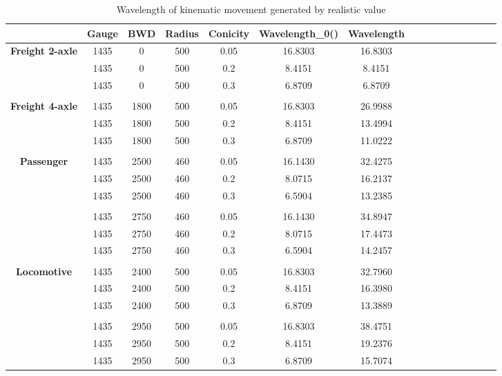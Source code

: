 \begin{table}[h]
  \centering
  \caption{Wavelength of kinematic movement generated by realistic value}
    \begin{tabular}{cccccccccccccccc}
    \toprule
    & Gauge & BWD & Radius & Conicity & Wavelength\_0() &Wavelength & \\
    \midrule
    \textbf{Freight 2-axle} & 1435 & 0 & 500 & 0.05 & 16.8303 & 16.8303 \\
    \textbf{} & 1435 & 0 & 500 & 0.2 & 8.4151 & 8.4151  \\
    \textbf{} & 1435 & 0 & 500 & 0.3 & 6.8709 & 6.8709  \\
    \textbf{}       &       &       &       &       &       &       &  \\
    \textbf{Freight 4-axle} & 1435 & 1800 & 500 & 0.05 & 16.8303 & 26.9988 \\
    \textbf{} & 1435 & 1800 & 500 & 0.2 & 8.4151 & 13.4994  \\
    \textbf{} & 1435 & 1800 & 500 & 0.3 & 6.8709 & 11.0222  \\
    \textbf{}       &       &       &       &       &       &       &  \\
    \textbf{Passenger} & 1435 & 2500 & 460 & 0.05 & 16.1430 & 32.4275 \\
    \textbf{} & 1435 & 2500 & 460 & 0.2 & 8.0715 & 16.2137  \\
    \textbf{} & 1435 & 2500 & 460 & 0.3 & 6.5904 & 13.2385 \\
    \textbf{}       &       &       &       &       &       &       &  \\
    \textbf{} & 1435 & 2750 & 460 & 0.05 & 16.1430 & 34.8947 \\
    \textbf{} & 1435 & 2750 & 460 & 0.2 & 8.0715 & 17.4473  \\
    \textbf{} & 1435 & 2750 & 460 & 0.3 & 6.5904 & 14.2457  \\
    \textbf{}       &       &       &       &       &       &       &  \\
    \textbf{Locomotive} & 1435 & 2400 & 500 & 0.05 & 16.8303 & 32.7960 \\
    \textbf{} & 1435 & 2400 & 500 & 0.2 & 8.4151 & 16.3980  \\
    \textbf{} & 1435 & 2400 & 500 & 0.3 & 6.8709 & 13.3889  \\
    \textbf{}       &       &       &       &       &       &       &  \\
    \textbf{} & 1435 & 2950 & 500 & 0.05 & 16.8303 & 38.4751 \\
    \textbf{} & 1435 & 2950 & 500 & 0.2 & 8.4151 & 19.2376  \\
    \textbf{} & 1435 & 2950 & 500 & 0.3 & 6.8709 & 15.7074  \\
    \bottomrule
    \end{tabular}%
  \label{tab:wavelengthrealistic}%
\end{table}%

